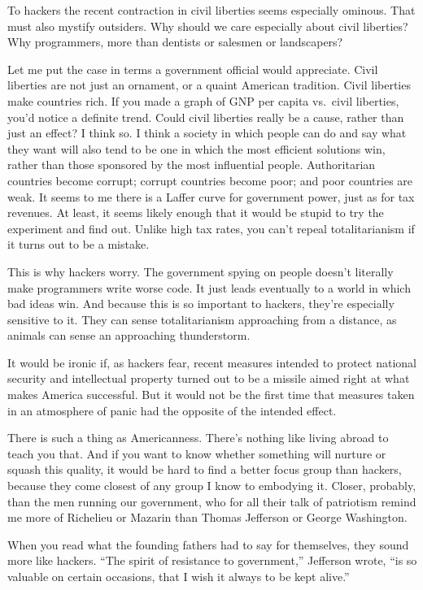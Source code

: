\documentclass[12pt]{book}
\begin{document}
To hackers the recent contraction in civil liberties seems especially
ominous. That must also mystify outsiders. Why should we care especially
about civil liberties? Why programmers, more than dentists or salesmen
or landscapers?

Let me put the case in terms a government official would appreciate.
Civil liberties are not just an ornament, or a quaint American
tradition. Civil liberties make countries rich. If you made a graph of
GNP per capita vs.~civil liberties, you'd notice a definite trend. Could
civil liberties really be a cause, rather than just an effect? I think
so. I think a society in which people can do and say what they want will
also tend to be one in which the most efficient solutions win, rather
than those sponsored by the most influential people. Authoritarian
countries become corrupt; corrupt countries become poor; and poor
countries are weak. It seems to me there is a Laffer curve for
government power, just as for tax revenues. At least, it seems likely
enough that it would be stupid to try the experiment and find out.
Unlike high tax rates, you can't repeal totalitarianism if it turns out
to be a mistake.

This is why hackers worry. The government spying on people doesn't
literally make programmers write worse code. It just leads eventually to
a world in which bad ideas win. And because this is so important to
hackers, they're especially sensitive to it. They can sense
totalitarianism approaching from a distance, as animals can sense an
approaching thunderstorm.

It would be ironic if, as hackers fear, recent measures intended to
protect national security and intellectual property turned out to be a
missile aimed right at what makes America successful. But it would not
be the first time that measures taken in an atmosphere of panic had the
opposite of the intended effect.

There is such a thing as Americanness. There's nothing like living
abroad to teach you that. And if you want to know whether something will
nurture or squash this quality, it would be hard to find a better focus
group than hackers, because they come closest of any group I know to
embodying it. Closer, probably, than the men running our government, who
for all their talk of patriotism remind me more of Richelieu or Mazarin
than Thomas Jefferson or George Washington.

When you read what the founding fathers had to say for themselves, they
sound more like hackers. ``The spirit of resistance to government,''
Jefferson wrote, ``is so valuable on certain occasions, that I wish it
always to be kept alive.''
\end{document}

